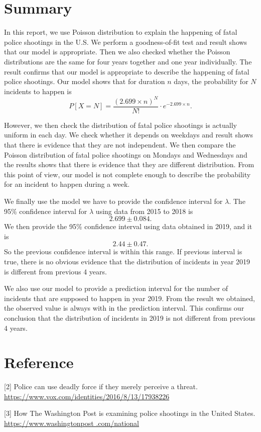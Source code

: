 \documentclass[11pt,a4paper,english]{article}
\begin{document}
\section{Summary}
In this report, we use Poisson distribution to explain the happening of fatal police shootings in the U.S. We perform a goodness-of-fit test and result shows that our model is appropriate. Then we also checked whether the Poisson distributions are the same for four years together and one year individually. The result confirms that our model is appropriate to describe the happening of fatal police shootings. Our model shows that for duration $n$ days, the probability for $N$ incidents to happen is 
\begin{equation*}
	P[X = N] = \frac{(2.699 \times n)^{N}}{N!}\cdot e^{-2.699 \times n}.
\end{equation*}

However, we then check the distribution of fatal police shootings is actually uniform in each day. We check whether it depends on weekdays and result shows that there is evidence that they are not independent. We then compare the Poisson distribution of fatal police shootings on Mondays and Wednesdays and the results shows that there is evidence that they are different distribution. From this point of view, our model is not complete enough to describe the probability for an incident to happen during a week.

We finally use the model we have to provide the confidence interval for $\lambda$. The 95\% confidence interval for $\lambda$ using data from 2015 to 2018 is 
\[2.699 \pm 0.084.\]
We then provide the 95\% confidence interval using data obtained in 2019, and it is 
\[2.44 \pm 0.47.\]
So the previous confidence interval is within this range. If previous interval is true, there is no obvious evidence that the distribution of incidents in year 2019 is different from previous 4 years.

We also use our model to provide a prediction interval for the number of incidents that are supposed to happen in year 2019. From the result we obtained, the observed value is always with in the prediction interval. This confirms our conclusion that the distribution of incidents in 2019 is not different from previous 4 years. 
\section{Reference}
[2] Police can use deadly force if they merely perceive a threat. \href{https://www.vox.com/identities/2016/8/13/17938226/police-shootings-killings-law-legal-standard-garner-graham-connor}{https://www.vox.com/identities/2016/8/13/17938226}

[3] How The Washington Post is examining police shootings in the United States. \href{https://www.washingtonpost .com/national/how-the-washington-post-is-examining-police-shootings-in-the-united-states/2016/07/07/d9c52238-43ad-11e6-8856-f26de2537a9d_story.html?utm_term=.bb540299ce96}{https://www.washingtonpost .com/national}
\end{document}
